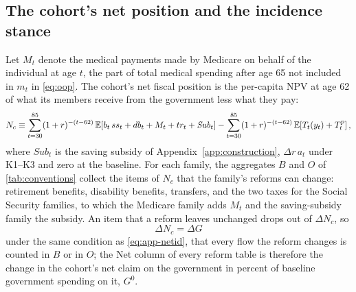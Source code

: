 \subsection{The cohort's net position and the incidence stance}\label{app:netposition}

Let $M_t$ denote the medical payments made by Medicare on behalf of the individual at age $t$, the part of total medical spending after age 65 not included in $m_t$ in \eqref{eq:oop}. The cohort's net fiscal position is the per-capita NPV at age 62 of what its members receive from the government less what they pay:
\begin{equation}\label{eq:netposition}
N_c\equiv\sum_{t=30}^{85}(1+r)^{-(t-62)}\,{\mathbb E}\!\left[b_t\,ss_t+db_t+M_t+tr_t+\mathit{Sub}_t\right]-\sum_{t=30}^{85}(1+r)^{-(t-62)}\,{\mathbb E}\!\left[T_t(y_t)+T^{p}_t\right],
\end{equation}
where $\mathit{Sub}_t$ is the saving subsidy of Appendix~\ref{app:construction}, $\Delta r\,a_t$ under K1--K3 and zero at the baseline. For each family, the aggregates $B$ and $O$ of \autoref{tab:conventions} collect the items of $N_c$ that the family's reforms can change: retirement benefits, disability benefits, transfers, and the two taxes for the Social Security families, to which the Medicare family adds $M_t$ and the saving-subsidy family the subsidy. An item that a reform leaves unchanged drops out of $\Delta N_c$, so
\begin{equation}\label{eq:app-dnc}
\Delta N_c=\Delta G
\end{equation}
under the same condition as \eqref{eq:app-netid}, that every flow the reform changes is counted in $B$ or in $O$; the Net column of every reform table is therefore the change in the cohort's net claim on the government in percent of baseline government spending on it, $G^{0}$.

